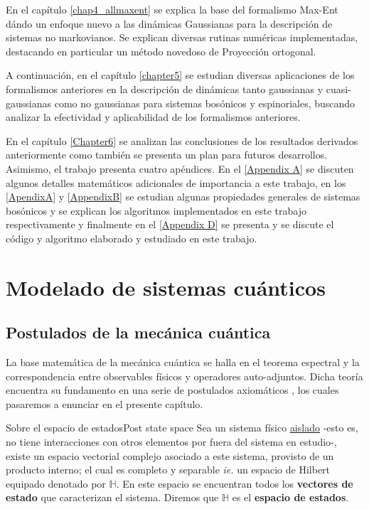\documentclass{report} %
\newcommand{\ie}{\textit{ie. }}
\numberwithin{equation}{section}
\begin{document}
En el capítulo \autoref{chap4_allmaxent} se explica la base del formalismo Max-Ent dándo un enfoque nuevo a las dinámicas Gaussianas para la descripción de sistemas no markovianos. Se explican diversas rutinas numéricas implementadas, destacando en particular un método novedoso de Proyección ortogonal. 

A continuación, en el capítulo \autoref{chapter5}
se estudian diversas aplicaciones de los formalismos anteriores en la descripción de dinámicas tanto gaussianas y cuasi-gaussianas como no gaussianas para sistemas bosónicos y espinoriales, buscando analizar la efectividad y aplicabilidad de los formalismos anteriores. 

En el capítulo \autoref{Chapter6} se analizan las conclusiones de los resultados derivados anteriormente como también se presenta un plan para futuros desarrollos. Asimismo, el trabajo presenta cuatro apéndices. En el \autoref{Appendix A} se discuten algunos detalles matemáticos adicionales de importancia a este trabajo, en los \autoref{ApendixA} y \autoref{AppendixB} se estudian algunas propiedades generales de sistemas bosónicos y se explican los algoritmos implementados en este trabajo respectivamente y finalmente en el \autoref{Appendix D} se presenta y se discute el código y algoritmo elaborado y estudiado en este trabajo. 

\newpage\null\thispagestyle{empty}\newpage

\chapter{Modelado de sistemas cu\'anticos }
\label{chapter2}

\section{Postulados de la mec\'anica cu\'antica}

La base matemática de la mecánica cuántica se halla en el teorema espectral  \cite{HoracioI,HeinzPetruccione,BCHallp} y la correspondencia entre observables físicos y operadores auto-adjuntos. Dicha teoría encuentra su fundamento en una serie de postulados axiomáticos \cite{CohenTannoudji1989, Nielsen.00, HeinzPetruccione, Portesi-ECI34, Holik-ECI34}, los cuales pasaremos a enunciar en el presente capítulo.

\begin{post}{Sobre el espacio de estados}{Post state space}
Sea un sistema físico \underline{aislado} -esto es, no tiene interacciones con otros elementos por fuera del sistema en estudio-, existe un espacio vectorial complejo asociado a este sistema, provisto de un producto interno; el cual es completo y separable \ie un espacio de Hilbert equipado \cite{Nielsen.00, NakaharaM} denotado por $\mathbb{H}$. En este espacio se encuentran todos los \textbf{vectores de estado} que caracterizan el sistema. Diremos que $\mathbb{H}$ es el \textbf{espacio de estados}. 
\label{Post state space}
\end{post}
\end{document}
